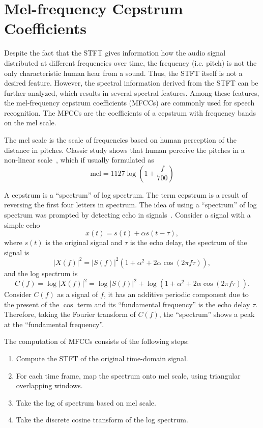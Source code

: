 \documentclass[12pt,final,twoside]{report}
\begin{document}
\section{Mel-frequency Cepstrum Coefficients}
Despite the fact that the STFT gives information how the audio signal distributed at different frequencies over time, the frequency (i.e. pitch) is not the only characteristic human hear from a sound. Thus, the STFT itself is not a desired feature. However, the spectral information derived from the STFT can be further analyzed, which results in several spectral features. Among these features, the mel-frequency cepstrum coefficients (MFCCs) are commonly used for speech recognition.
The MFCCs are the coefficients of a cepstrum with frequency bands on the mel scale.

The mel scale is the scale of frequencies based on human perception of the distance in pitches. Classic study shows that human perceive the pitches in a non-linear scale~\cite{stevens_scale_1937}, which if usually formulated as~\cite{oshaughnessy_speech_1987}
\begin{equation}
  \text{mel} = 1127 \log (1 + \frac{f}{700})
\end{equation}

A cepstrum is a ``spectrum'' of log spectrum. The term cepstrum is a result of reversing the first four letters in spectrum. The idea of using a ``spectrum'' of log spectrum was prompted by detecting echo in signals~\cite{oppenheim_frequency_2004}. Consider a signal with a simple echo
\begin{equation}
  x(t) = s(t) + \alpha s(t - \tau),
\end{equation}
where $s(t)$ is the original signal and $\tau$ is the echo delay, the spectrum of the signal is
\begin{equation}
  \left| X(f) \right|^2 = \left| S(f) \right|^2 (1 + \alpha^2 + 2 \alpha \cos(2 \pi f \tau)),
\end{equation}
and the log spectrum is
\begin{equation}
  C(f) = \log \left| X(f) \right|^2 = \log \left| S(f) \right|^2 + \log (1 + \alpha^2 + 2 \alpha \cos(2 \pi f \tau)).
\end{equation}
Consider $C(f)$ as a signal of $f$, it has an additive periodic component due to the present of the $\cos$ term and its ``fundamental frequency'' is the echo delay $\tau$. Therefore, taking the Fourier transform of $C(f)$, the ``spectrum'' shows a peak at the ``fundamental frequency''. 

The computation of MFCCs consists of the following steps:
\begin{enumerate}
  \item Compute the STFT of the original time-domain signal.
  \item For each time frame, map the spectrum onto mel scale, using triangular overlapping windows.
  \item Take the log of spectrum based on mel scale.
  \item Take the discrete cosine transform of the log spectrum.
\end{enumerate}
\end{document}
